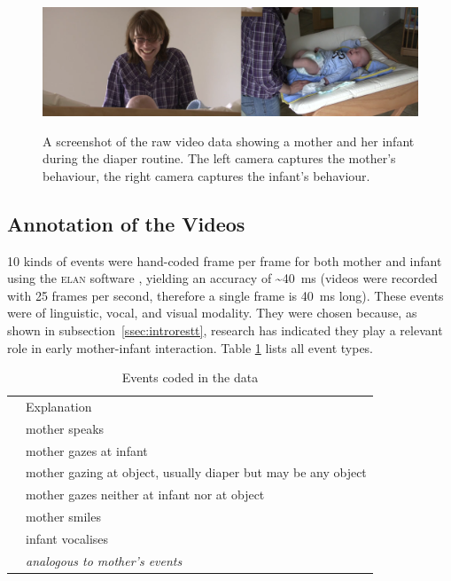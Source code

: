 \begin{figure}
	\includegraphics[width=\textwidth]{../aux/img/video_vp_08_compact.png}
	\label{fig:rawvid}
	\caption[Screenshot of the raw video data.]{A screenshot of the raw video data showing a mother and her infant during the diaper routine. The left camera captures the mother's behaviour, the right camera captures the infant's behaviour.}
\end{figure}

\subsection{Annotation of the Videos}
\label{ssec:fpmmetann}
10 kinds of events were hand-coded frame per frame for both mother and infant using the \textsc{elan} software \citep{wittenburg_elan_2006}, yielding an accuracy of \textasciitilde40~ms (videos were recorded with 25 frames per second, therefore a single frame is 40~ms long).
These events were of linguistic, vocal, and visual modality.  %
They were chosen because, as shown in subsection~\ref{ssec:introrestt}, research has indicated they play a relevant role in early mother-infant interaction.
Table \ref{tab:events} lists all event types.

\begin{table}
	\centering
	\begin{tabularx}{\textwidth}{>{\ttfamily}lX}  %
		\toprule
		{\rmfamily Event}	& Explanation \\
		\cmidrule(lr){1-1} \cmidrule(lr){2-2}
		\mosp	& mother speaks \\
		\mogain	& mother gazes at infant \\
		\mogaob	& mother gazing at object, usually diaper but may be any object \\
		\mogaaw	& mother gazes neither at infant nor at object \\
		\mosm	& mother smiles \\
		\midrule
		\invo	& infant vocalises \\
		\cmidrule(lr){2-2}
		\ingamo	& \multirow{4}{*}{\textit{analogous to mother's events}} \\
		\ingaob \\
		\ingaaw \\
		\insm \\
		\bottomrule
	\end{tabularx}
	\caption{Events coded in the data}
	\label{tab:events}
\end{table}

